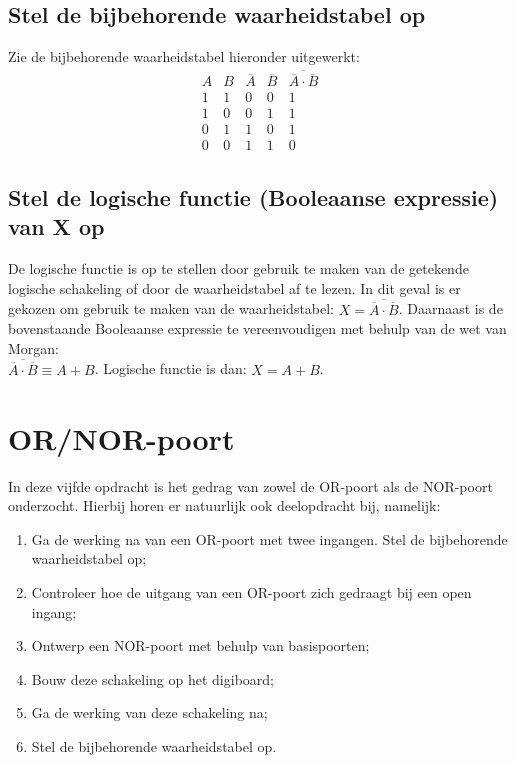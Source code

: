 \documentclass[12pt]{article}
\begin{document}
\subsection{Stel de bijbehorende waarheidstabel op}
Zie de bijbehorende waarheidstabel hieronder uitgewerkt:
\begin{displaymath}
    \begin{array}{|c|c||c|c|c|}
    A & B & \overline{A} & \overline{B} & \overline{\overline{A} \cdot \overline{B}} \\ 
    \hline 
    1 & 1 & 0 & 0 & 1 \\
    1 & 0 & 0 & 1 & 1 \\
    0 & 1 & 1 & 0 & 1 \\
    0 & 0 & 1 & 1 & 0
    \end{array}
    \end{displaymath}

\subsection{Stel de logische functie (Booleaanse expressie) van X op}
De logische functie is op te stellen door gebruik te maken van de getekende logische schakeling of door de waarheidstabel af te lezen. 
In dit geval is er gekozen om gebruik te maken van de waarheidstabel: $X = \overline{\overline{A} \cdot \overline{B}}$. 
Daarnaast is de bovenstaande Booleaanse expressie te vereenvoudigen met behulp van de wet van Morgan:\\
$\overline{\overline{A} \cdot \overline{B}} \equiv A + B$. Logische functie is dan: $X = A + B$.
\pagebreak
\section{OR/NOR-poort}
In deze vijfde opdracht is het gedrag van zowel de OR-poort als de NOR-poort onderzocht. Hierbij horen er natuurlijk ook deelopdracht bij, namelijk:
\begin{enumerate}
    \item Ga de werking na van een OR-poort met twee ingangen. Stel de bijbehorende waarheidstabel op; 
    \item Controleer hoe de uitgang van een OR-poort zich gedraagt bij een open ingang;
    \item Ontwerp een NOR-poort met behulp van basispoorten;
    \item Bouw deze schakeling op het digiboard;
    \item Ga de werking van deze schakeling na;
    \item Stel de bijbehorende waarheidstabel op.
\end{enumerate}
\end{document}
